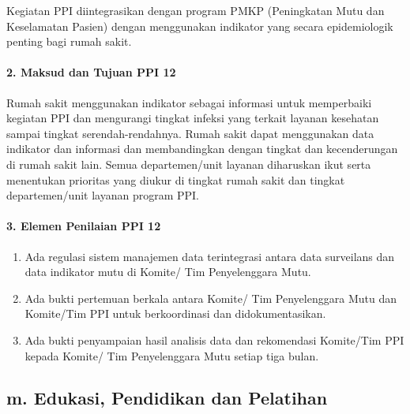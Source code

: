 \documentclass[
]{book}
\providecommand{\tightlist}{%
  \setlength{\itemsep}{0pt}\setlength{\parskip}{0pt}}
\begin{document}
Kegiatan PPI diintegrasikan dengan program PMKP (Peningkatan Mutu dan Keselamatan Pasien) dengan menggunakan indikator yang secara epidemiologik penting bagi rumah sakit.

\hypertarget{maksud-dan-tujuan-ppi-12}{%
\paragraph*{2. Maksud dan Tujuan PPI 12}\label{maksud-dan-tujuan-ppi-12}}

Rumah sakit menggunakan indikator sebagai informasi untuk memperbaiki kegiatan PPI dan mengurangi tingkat infeksi yang terkait layanan kesehatan sampai tingkat serendah-rendahnya. Rumah sakit dapat menggunakan data indikator dan informasi dan membandingkan dengan tingkat dan kecenderungan di rumah sakit lain. Semua departemen/unit layanan diharuskan ikut serta menentukan prioritas yang diukur di tingkat rumah sakit dan tingkat departemen/unit layanan program PPI.

\hypertarget{elemen-penilaian-ppi-12}{%
\paragraph*{3. Elemen Penilaian PPI 12}\label{elemen-penilaian-ppi-12}}

\begin{enumerate}
\def\labelenumi{\alph{enumi}.}
\tightlist
\item
  Ada regulasi sistem manajemen data terintegrasi antara data surveilans dan data indikator mutu di Komite/ Tim Penyelenggara Mutu.
\item
  Ada bukti pertemuan berkala antara Komite/ Tim Penyelenggara Mutu dan Komite/Tim PPI untuk berkoordinasi dan didokumentasikan.
\item
  Ada bukti penyampaian hasil analisis data dan rekomendasi Komite/Tim PPI kepada Komite/ Tim Penyelenggara Mutu setiap tiga bulan.
\end{enumerate}

\hypertarget{m.-edukasi-pendidikan-dan-pelatihan}{%
\subsection*{m. Edukasi, Pendidikan dan Pelatihan}\label{m.-edukasi-pendidikan-dan-pelatihan}}
\end{document}
